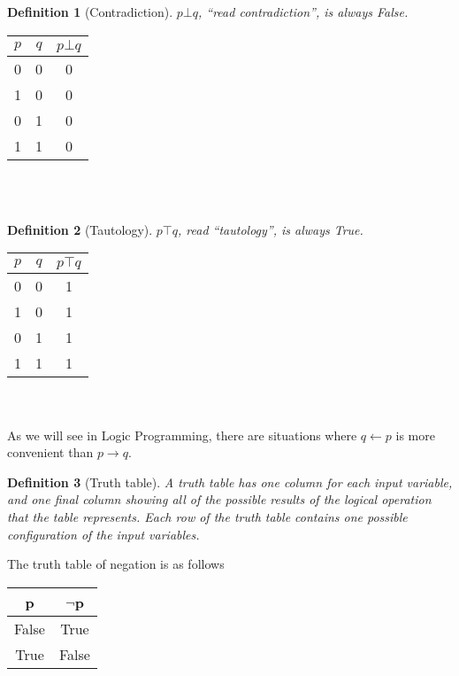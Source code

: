 \documentclass[10pt,a4paper,draft,titlepage,onecolumn]{book}
\newtheorem{definition}{Definition}[section]
\begin{document}
\begin{definition}[Contradiction] $p{\bot}q$, ``read \textit{contradiction}'', is always False.
\end{definition}
\begin{tabular}{ |c|c|c| }
 \hline
 $p$ & $q$ &  $p{\bot}q$  \\
 \hline
 0 & 0 & 0 \\
 1 & 0 & 0\\
 0 & 1 & 0\\
 1 & 1 & 0\\
 \hline
\end{tabular}\\\\

\begin{definition}[Tautology] $p{\top}q$, read ``\textit{tautology}'', is always True.
\end{definition}
\begin{tabular}{ |c|c|c| }
 \hline
 $p$ & $q$ &  $p{\top}q$  \\
 \hline
 0 & 0 & 1\\
 1 & 0 & 1\\
 0 & 1 & 1\\
 1 & 1 & 1\\
 \hline
\end{tabular}\\\\



As we will see in Logic Programming, there are situations where $q  \leftarrow p$  is more convenient than $ p \rightarrow q$.


\begin{definition}[Truth table] A truth table has one column for each input variable, and one final column showing all of the possible results of the logical operation that the table represents. Each row of the truth table contains one possible configuration of the input variables.
\end{definition} 

The truth table of negation is as follows 
\begin{center}
\begin{tabular}{ |c| c| }
 \hline
 p & {$\neg$}p \\
 \hline
 False & True \\ 
 True &  False \\
 \hline
\end{tabular}
\end{center}
\end{document}
